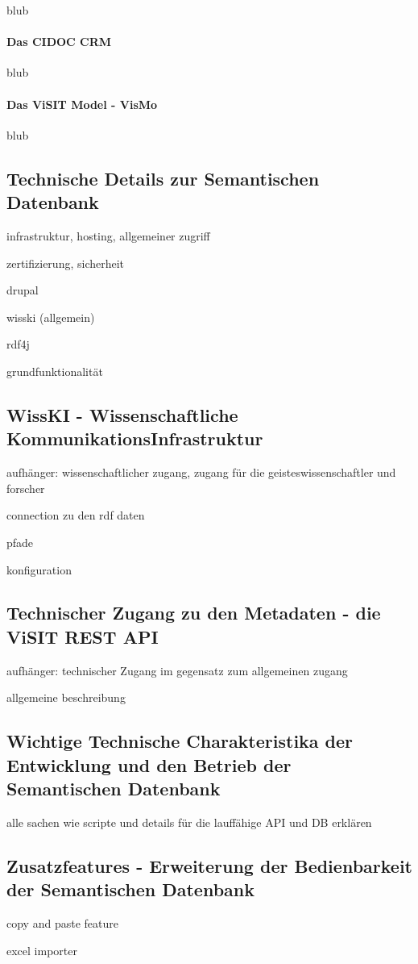 blub

\paragraph{Das CIDOC CRM}

blub

\paragraph{Das ViSIT Model - VisMo}

blub

\subsection{Technische Details zur Semantischen Datenbank}\label{sec:technicalBackground}

infrastruktur, hosting, allgemeiner zugriff

zertifizierung, sicherheit

drupal

wisski (allgemein)

rdf4j

grundfunktionalität

\subsection{WissKI - Wissenschaftliche KommunikationsInfrastruktur}\label{sec:wisski}

aufhänger: wissenschaftlicher zugang, zugang für die geisteswissenschaftler und forscher

connection zu den rdf daten

pfade

konfiguration

\subsection{Technischer Zugang zu den Metadaten - die ViSIT REST API}\label{sec:rest}

aufhänger: technischer Zugang im gegensatz zum allgemeinen zugang

allgemeine beschreibung

\subsection{Wichtige Technische Charakteristika der Entwicklung und den Betrieb der Semantischen Datenbank}\label{sec:features}

alle sachen wie scripte und details für die lauffähige API und DB erklären 

\subsection{Zusatzfeatures - Erweiterung der Bedienbarkeit der Semantischen Datenbank}\label{sec:additional_features}

copy and paste feature

excel importer









